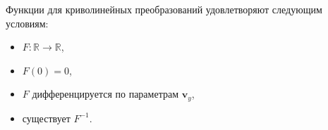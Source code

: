 \documentclass[12pt,twoside]{article}
\newcommand{\bY}{\mathbf{Y}}
\newcommand{\bv}{\mathbf{v}}
\begin{document}
 

Функции для криволинейных преобразований удовлетворяют следующим условиям:
\begin{itemize}
    \item $F: \mathbb{R} \to \mathbb{R}$,
    \item $F(0) = 0$,
    \item $F$ дифференцируется по параметрам $\bv_y$,
    \item существует $F^{-1}$.
\end{itemize}
\end{document}
